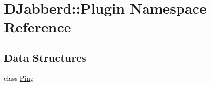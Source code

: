 \hypertarget{namespace_d_jabberd_1_1_plugin}{
\section{\-D\-Jabberd\-:\-:\-Plugin \-Namespace \-Reference}
\label{namespace_d_jabberd_1_1_plugin}
}
\subsection*{\-Data \-Structures}
\begin{DoxyCompactItemize}
\item 
class \hyperlink{class_d_jabberd_1_1_plugin_1_1_ping}{\-Ping}
\end{DoxyCompactItemize}

